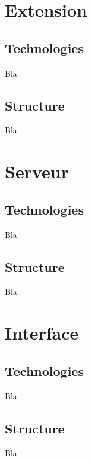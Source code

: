 
\section{Extension}

	\subsection{Technologies}

		Bla

	\subsection{Structure}

		Bla


\section{Serveur}

	\subsection{Technologies}

		Bla

	\subsection{Structure}

		Bla


\section{Interface}

	\subsection{Technologies}

		Bla

	\subsection{Structure}

		Bla